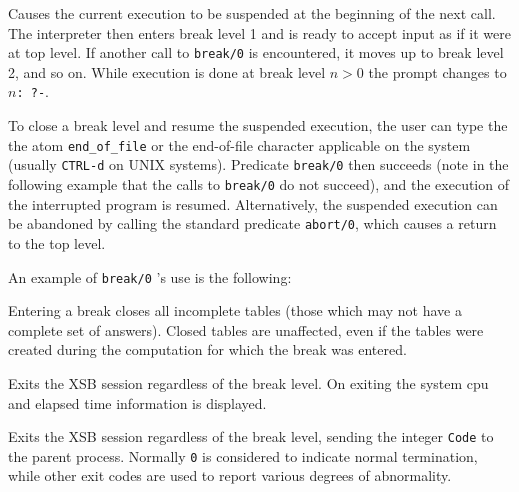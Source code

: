 \begin{description}

    Causes the current execution to be suspended at the beginning of the next 
    call.  The interpreter then enters break level 1 and is ready to accept
    input as if it were at top level.  If another call to {\tt break/0} is 
    encountered, it moves up to break level 2, and so on.  While execution 
    is done at break level $n>0$ the prompt changes to {\tt $n$: ?-}.

    To close a break level and resume the suspended execution, the user can 
    type the the atom {\tt end\_of\_file} or the end-of-file character 
    applicable on the system (usually {\tt CTRL-d} on UNIX systems).  
    Predicate {\tt break/0} 
    then succeeds (note in the following example that the calls to {\tt break/0}
    do not succeed), and the execution of the interrupted program is resumed.  
    Alternatively, the suspended execution can be abandoned by calling the 
    standard predicate {\tt abort/0}, which causes a return to the top level.

    An example of {\tt break/0} 's use is the following:


    Entering a break closes all incomplete tables (those which may not have a 
    complete set of answers).  Closed tables are unaffected, even if 
    the tables were created during the computation for which the break was
    entered.

%
    Exits the XSB session regardless of the break level.  On exiting
    the system cpu and elapsed time information is displayed.

%
Exits the XSB session regardless of the break level, sending the
integer {\tt Code} to the parent process.  Normally {\tt 0} is
considered to indicate normal termination, while other exit codes are
used to report various degrees of abnormality.


\end{description}
